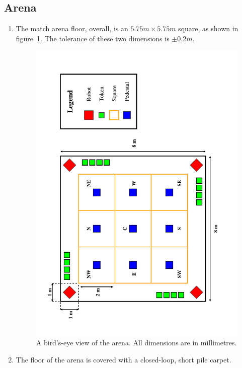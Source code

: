 \subsection{Arena}
\label{sub:arena}
\begin{enumerate}
\item The match arena floor, overall, is an $5.75m \times 5.75m$ square, as shown in figure~\ref{fig:arena-dim}.
      The tolerance of these two dimensions is $\pm0.2m$.

\begin{figure}
  \centering
  \includegraphics[width=\textwidth]{./images/arena.pdf}
  \caption{\label{fig:arena-dim}A bird's-eye view of the arena. All dimensions are in millimetres.}
\end{figure}

\item The floor of the arena is covered with a closed-loop, short pile carpet.


\end{enumerate}
